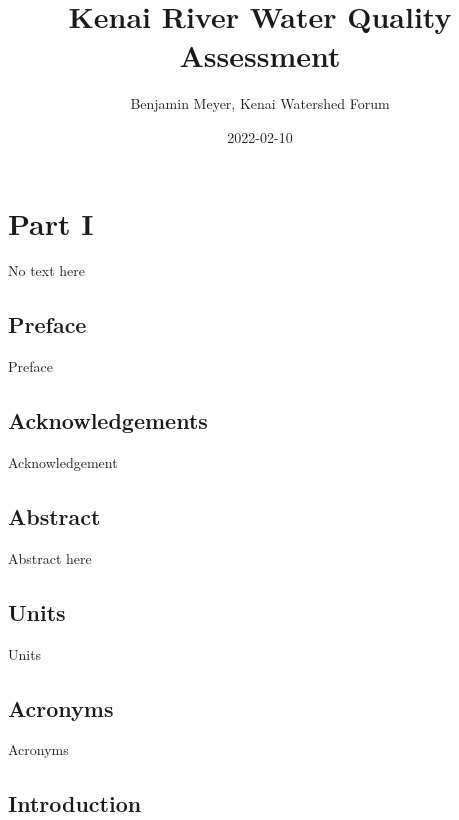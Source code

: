 \documentclass[
]{book}
\title{Kenai River Water Quality Assessment}
\author{Benjamin Meyer, Kenai Watershed Forum}
\date{2022-02-10}
\begin{document}
\maketitle

{
\setcounter{tocdepth}{1}
\tableofcontents
}
\hypertarget{part-part-i}{%
\part{Part I}\label{part-part-i}}

No text here

\hypertarget{preface}{%
\chapter*{Preface}\label{preface}}

Preface

\hypertarget{acknowledgements}{%
\chapter*{Acknowledgements}\label{acknowledgements}}

Acknowledgement

\hypertarget{abstract}{%
\chapter*{Abstract}\label{abstract}}

Abstract here

\hypertarget{units}{%
\chapter*{Units}\label{units}}

Units

\hypertarget{acronyms}{%
\chapter*{Acronyms}\label{acronyms}}

Acronyms

\hypertarget{introduction}{%
\chapter{Introduction}\label{introduction}}
\end{document}
